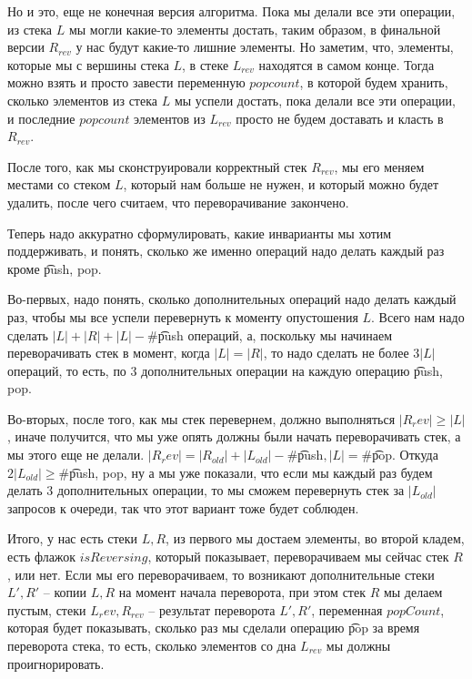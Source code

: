 Но и это, еще не конечная версия алгоритма. Пока мы делали все эти операции, из стека $L$ мы могли какие-то элементы достать,
таким образом, в финальной версии $R_{rev}$ у нас будут какие-то лишние элементы. 
Но заметим, что, элементы, которые мы с вершины стека $L$, в стеке $L_{rev}$ находятся в самом конце.
Тогда можно взять и просто завести переменную $popcount$, в которой будем хранить, сколько элементов из стека $L$ мы успели достать, пока делали
все эти операции, и последние $popcount$ элементов из $L_{rev}$ просто не будем доставать и класть в $R_{rev}$.

После того, как мы сконструировали корректный стек $R_{rev}$, мы его меняем местами со стеком $L$, который нам больше не нужен, и который можно будет
удалить, после чего считаем, что переворачивание закончено.

Теперь надо аккуратно сформулировать, какие инварианты мы хотим поддерживать, и понять, сколько же именно операций надо делать каждый раз кроме
\t{push, pop}.
                
Во-первых, надо понять, сколько дополнительных операций надо делать каждый раз, чтобы мы все успели перевернуть к моменту опустошения $L$.
Всего нам надо сделать $|L| + |R| + |L| - \#$\t{push} операций, а, поскольку мы начинаем переворачивать стек в момент, когда $|L| = |R|$, то
надо сделать не более $3|L|$ операций, то есть, по 3 дополнительных операции на каждую операцию \t{push, pop}.

Во-вторых, после того, как мы стек перевернем, должно выполняться $|R_rev| \ge |L|$, иначе получится, что мы уже опять должны были начать переворачивать
стек, а мы этого еще не делали.
$|R_rev| = |R_{old}| + |L_{old}| - \#$\t{push}$, |L| = \#$\t{pop}. 
Откуда $2|L_{old}| \ge \#$\t{push, pop}, ну а мы уже показали, что если мы каждый раз будем делать 3 дополнительных операции, то мы сможем перевернуть
стек за $|L_{old}|$ запросов к очереди, так что этот вариант тоже будет соблюден.

Итого, у нас есть стеки $L, R$, из первого мы достаем элементы, во второй кладем, есть флажок $isReversing$, который показывает, переворачиваем мы сейчас
стек $R$, или нет.
Если мы его переворачиваем, то возникают дополнительные стеки $L', R'$ -- копии $L, R$ на момент начала переворота, при этом стек $R$ мы делаем пустым,
стеки $L_rev, R_{rev}$ -- результат переворота $L', R'$, переменная $popCount$, которая будет показывать, сколько раз мы сделали операцию \t{pop} за время 
переворота стека, то есть, сколько элементов со дна $L_{rev}$ мы должны проигнорировать.

